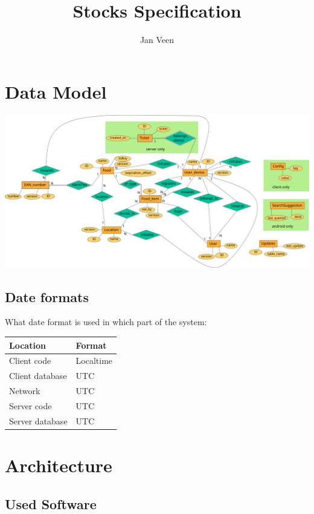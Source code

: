 \documentclass[12pt]{report}
\begin{document}
\title{Stocks Specification}			%
\author{Jan Veen}
\maketitle				%
\cleardoublepage
{}
\tableofcontents

\chapter{Data Model}

\includegraphics[width=\linewidth]{diagrams/ER-diagram.png}

\section{Date formats}
What date format is used in which part of the system:

\begin{tabular}{l l}
Location & Format \\\hline
Client code & Localtime \\\hline
Client database & UTC \\\hline
Network & UTC \\\hline
Server code & UTC \\\hline
Server database & UTC \\\hline
\end{tabular}

\chapter{Architecture}

\section{Used Software}
\end{document}
